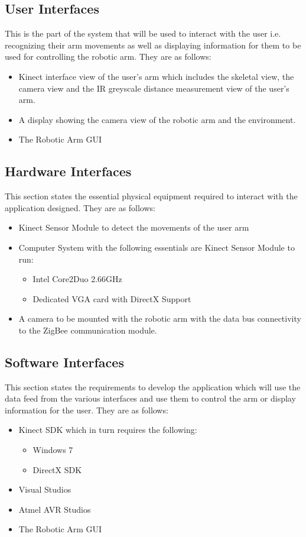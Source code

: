 \documentclass[a4wide]{scrreprt}
\begin{document}
\subsection{User Interfaces}
This is the part of the system that will be used to interact with the user i.e. recognizing their arm movements as well as displaying information for them to be used for controlling the robotic arm. They are as follows:
\begin{itemize}
\item Kinect interface view of the user's arm  which includes the skeletal view, the camera view and the IR greyscale distance measurement view of the user's arm.
\item A display showing the camera view of the robotic arm and the environment.
\item The Robotic Arm GUI 
\end{itemize}

\subsection{Hardware Interfaces}
This section states the essential physical equipment required to interact with the application designed. They are as follows:
\begin{itemize}
\item Kinect Sensor Module to detect the movements of the user arm
\item Computer System with the following essentials are Kinect Sensor Module to run:
\begin{itemize}
\item  Intel Core2Duo 2.66GHz
\item  Dedicated VGA card with DirectX Support
\end{itemize}
\item A camera to be mounted with the robotic arm with the data bus connectivity to the ZigBee communication module.
\end{itemize}

\subsection{Software Interfaces}
This section states the requirements to develop the application which will use the data feed from the various interfaces and use them to control the arm or display information for the user. They are as follows:
\begin{itemize}
\item Kinect SDK which in turn requires the following:
\begin{itemize}
\item  Windows 7
\item  DirectX SDK
\end{itemize}
\item Visual Studios
\item Atmel AVR Studios
\item The Robotic Arm GUI
\end{itemize}
\end{document}
